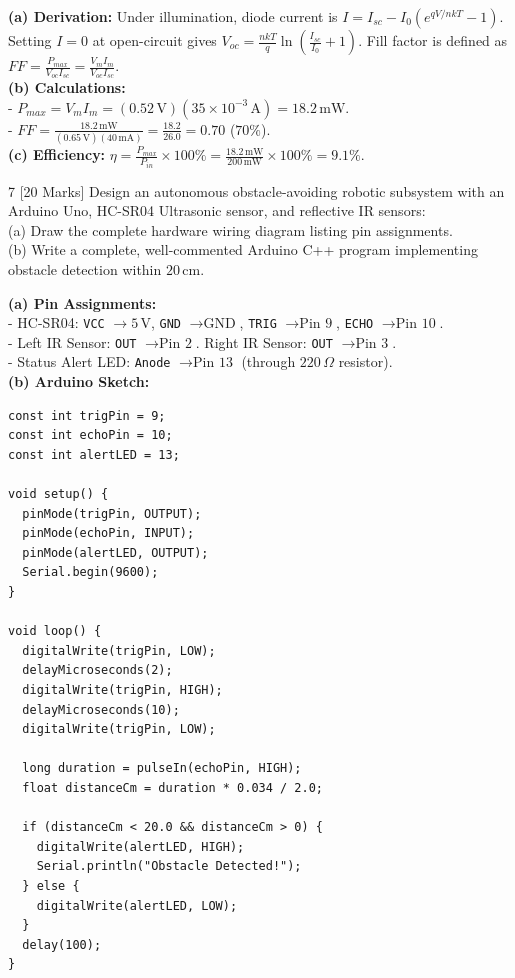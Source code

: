 \begin{solbox}
\textbf{(a) Derivation:} Under illumination, diode current is $I = I_{sc} - I_0(e^{qV/nkT} - 1)$. Setting $I=0$ at open-circuit gives $V_{oc} = \frac{nkT}{q}\ln\left(\frac{I_{sc}}{I_0} + 1\right)$. Fill factor is defined as $FF = \frac{P_{max}}{V_{oc} I_{sc}} = \frac{V_m I_m}{V_{oc} I_{sc}}$.\\
\textbf{(b) Calculations:}\\
- $P_{max} = V_m I_m = (0.52\,\text{V})(35 \times 10^{-3}\,\text{A}) = 18.2\,\text{mW}$.\\
- $FF = \frac{18.2\,\text{mW}}{(0.65\,\text{V})(40\,\text{mA})} = \frac{18.2}{26.0} = 0.70$ ($70\%$).\\
\textbf{(c) Efficiency:} $\eta = \frac{P_{max}}{P_{in}} \times 100\% = \frac{18.2\,\text{mW}}{200\,\text{mW}} \times 100\% = 9.1\%$.
\end{solbox}

\begin{examqbox}{7 [20 Marks]}
Design an autonomous obstacle-avoiding robotic subsystem with an Arduino Uno, HC-SR04 Ultrasonic sensor, and reflective IR sensors:\\
(a) Draw the complete hardware wiring diagram listing pin assignments.\\
(b) Write a complete, well-commented Arduino C++ program implementing obstacle detection within $20\,\text{cm}$.
\end{examqbox}

\begin{solbox}
\textbf{(a) Pin Assignments:}\\
- HC-SR04: \texttt{VCC} $\to 5\,\text{V}$, \texttt{GND} $\to \text{GND}$, \texttt{TRIG} $\to \text{Pin 9}$, \texttt{ECHO} $\to \text{Pin 10}$.\\
- Left IR Sensor: \texttt{OUT} $\to \text{Pin 2}$. Right IR Sensor: \texttt{OUT} $\to \text{Pin 3}$.\\
- Status Alert LED: \texttt{Anode} $\to \text{Pin 13}$ (through $220\,\Omega$ resistor).\\
\textbf{(b) Arduino Sketch:}
\begin{verbatim}
const int trigPin = 9;
const int echoPin = 10;
const int alertLED = 13;

void setup() {
  pinMode(trigPin, OUTPUT);
  pinMode(echoPin, INPUT);
  pinMode(alertLED, OUTPUT);
  Serial.begin(9600);
}

void loop() {
  digitalWrite(trigPin, LOW);
  delayMicroseconds(2);
  digitalWrite(trigPin, HIGH);
  delayMicroseconds(10);
  digitalWrite(trigPin, LOW);

  long duration = pulseIn(echoPin, HIGH);
  float distanceCm = duration * 0.034 / 2.0;

  if (distanceCm < 20.0 && distanceCm > 0) {
    digitalWrite(alertLED, HIGH);
    Serial.println("Obstacle Detected!");
  } else {
    digitalWrite(alertLED, LOW);
  }
  delay(100);
}
\end{verbatim}
\end{solbox}
